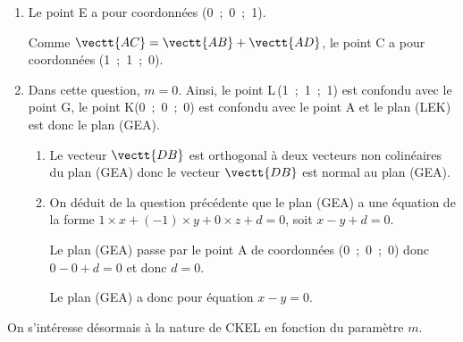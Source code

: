 \begin{enumerate}
\item Le point E a pour coordonnées (0~;~0~;~1).

Comme $\vectt{AC}=\vectt{AB}+\vectt{AD}$, le point C a pour coordonnées (1~;~1~;~0).

\item Dans cette question, $m = 0$. Ainsi, le point L\,(1~;~1~;~1) est confondu avec le point G, le point K(0~;~0~;~0) est confondu avec le point A et le plan (LEK) est donc le plan (GEA).
	\begin{enumerate}
		\item 
{}		
		
Le vecteur $\vectt{DB}$	est orthogonal à deux vecteurs non colinéaires du plan (GEA) donc le vecteur $\vectt{DB}$ est normal au plan (GEA).
		
		\item 
On déduit de la question précédente que le plan (GEA) a une équation de la forme $1\times x + (-1)\times y + 0\times z + d =0$, soit $x-y+d=0$.

Le plan (GEA) passe par le point A de coordonnées (0~;~0~;~0) donc $0-0+d=0$ et donc $d=0$.

Le plan (GEA) a donc pour équation $x-y=0$.
	\end{enumerate}
\end{enumerate}

On s'intéresse désormais à la nature de CKEL en fonction du paramètre $m$.

